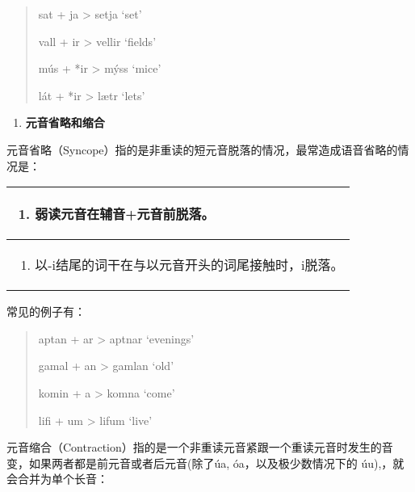 \begin{quote}
  sat + ja \textgreater{} setja `set'

  vall + ir \textgreater{} vellir `fields'

  mús + *ir \textgreater{} mýss `mice'

  lát + *ir \textgreater{} lætr `lets'
\end{quote}

\begin{enumerate}
  \def\labelenumi{\Alph{enumi}.}
  \setcounter{enumi}{1}
  \item
        \label{_Ref115693879}{}\textbf{元音省略和缩合}
\end{enumerate}

元音省略（Syncope）指的是非重读的短元音脱落的情况，最常造成语音省略的情况是：

\begin{longtable}{l}
  \toprule
  \begin{enumerate}\def\labelenumi{\arabic{enumi}.}\item  {}\label{_Ref115694569}{}弱读元音在辅音+元音前脱落。\end{enumerate} \\
  \midrule
  \endhead
  \bottomrule
  \endfoot
  \begin{minipage}[t]{\linewidth}\raggedright
    \begin{enumerate}
      \def\labelenumi{\arabic{enumi}.}
      \setcounter{enumi}{1}
      \item
            \label{_Ref115709879}{}以-i结尾的词干在与以元音开头的词尾接触时，i脱落。
    \end{enumerate}
  \end{minipage}                                                                                           \\
\end{longtable}

常见的例子有：

\begin{quote}
  aptan + ar \textgreater{} aptnar `evenings'

  gamal + an \textgreater{} gamlan `old'

  komin + a \textgreater{} komna `come'

  lifi + um \textgreater{} lifum `live'
\end{quote}

元音缩合（Contraction）指的是一个非重读元音紧跟一个重读元音时发生的音变，如果两者都是前元音或者后元音(除了úa,
óa，以及极少数情况下的 úu),，就会合并为单个长音：

